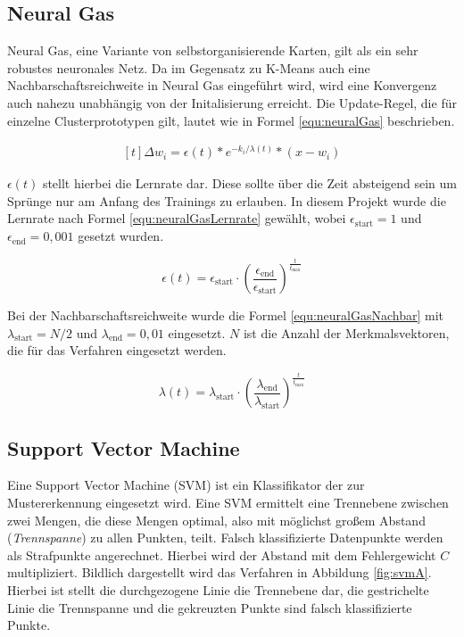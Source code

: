 \subsection{Neural Gas}
Neural Gas, eine Variante von selbstorganisierende Karten, gilt als ein sehr robustes neuronales Netz. Da im Gegensatz zu K-Means auch eine Nachbarschaftsreichweite in Neural Gas eingeführt wird, wird eine Konvergenz auch nahezu unabhängig von der Initalisierung erreicht. \cite{bib:neuralGas} Die Update-Regel, die für einzelne Clusterprototypen gilt, lautet wie in Formel \ref{equ:neuralGas} beschrieben.

\begin{equation}
	\label{equ:neuralGas}
	\begin{aligned}[t]\Delta w_{i} = \epsilon(t) * e^{-k_i / \lambda(t)} * \left(x - w_i\right)\end{aligned}
\end{equation}

$\epsilon(t)$ stellt hierbei die Lernrate dar. Diese sollte über die Zeit absteigend sein um Sprünge nur am Anfang des Trainings zu erlauben. In diesem Projekt wurde die Lernrate nach Formel \ref{equ:neuralGasLernrate} gewählt, wobei $\epsilon_\text{start} = 1$ und $\epsilon_\text{end} = 0,001$ gesetzt wurden.

\begin{equation}
	\label{equ:neuralGasLernrate}
	\epsilon(t) = \epsilon_\text{start} \cdot \left( \frac{\epsilon_\text{end}} {\epsilon_\text{start}} \right) ^ {\frac{t}{t_{\text{max}}}}
\end{equation}

Bei der Nachbarschaftsreichweite wurde die Formel \ref{equ:neuralGasNachbar} mit $\lambda_\text{start} = N/2$ und $\lambda_\text{end} = 0,01$ eingesetzt. $N$ ist die Anzahl der Merkmalsvektoren, die für das Verfahren eingesetzt werden.

\begin{equation}
	\label{equ:neuralGasNachbar}
	 \lambda(t) = \lambda_\text{start} \cdot \left( \frac{\lambda_\text{end}} {\lambda_\text{start}} \right) ^ {\frac{t}{t_{\text{max}}}}
\end{equation}


\subsection{Support Vector Machine}
Eine Support Vector Machine (SVM) ist ein Klassifikator der zur Mustererkennung eingesetzt wird. Eine SVM ermittelt eine Trennebene zwischen zwei Mengen, die diese Mengen optimal, also mit möglichst großem Abstand (\emph{Trennspanne}) zu allen Punkten, teilt. Falsch klassifizierte Datenpunkte werden als Strafpunkte angerechnet. Hierbei wird der Abstand mit dem Fehlergewicht $C$ multipliziert. Bildlich dargestellt wird das Verfahren in Abbildung \ref{fig:svmA}. Hierbei ist stellt die durchgezogene Linie die Trennebene dar, die gestrichelte Linie die Trennspanne und die gekreuzten Punkte sind falsch klassifizierte Punkte.

